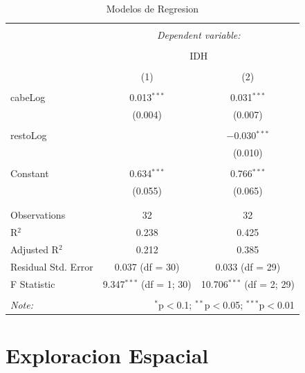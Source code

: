 \documentclass{article}
\begin{document}
\begin{table}[!htbp] \centering 
  \caption{Modelos de Regresion} 
  \label{regresiones} 
\begin{tabular}{@{\extracolsep{5pt}}lcc} 
\\[-1.8ex]\hline 
\hline \\[-1.8ex] 
 & \multicolumn{2}{c}{\textit{Dependent variable:}} \\ 
\cline{2-3} 
\\[-1.8ex] & \multicolumn{2}{c}{IDH} \\ 
\\[-1.8ex] & (1) & (2)\\ 
\hline \\[-1.8ex] 
 cabeLog & 0.013$^{***}$ & 0.031$^{***}$ \\ 
  & (0.004) & (0.007) \\ 
  & & \\ 
 restoLog &  & $-$0.030$^{***}$ \\ 
  &  & (0.010) \\ 
  & & \\ 
 Constant & 0.634$^{***}$ & 0.766$^{***}$ \\ 
  & (0.055) & (0.065) \\ 
  & & \\ 
\hline \\[-1.8ex] 
Observations & 32 & 32 \\ 
R$^{2}$ & 0.238 & 0.425 \\ 
Adjusted R$^{2}$ & 0.212 & 0.385 \\ 
Residual Std. Error & 0.037 (df = 30) & 0.033 (df = 29) \\ 
F Statistic & 9.347$^{***}$ (df = 1; 30) & 10.706$^{***}$ (df = 2; 29) \\ 
\hline 
\hline \\[-1.8ex] 
\textit{Note:}  & \multicolumn{2}{r}{$^{*}$p$<$0.1; $^{**}$p$<$0.05; $^{***}$p$<$0.01} \\ 
\end{tabular} 
\end{table} 
\clearpage


\section{Exploracion Espacial}
\end{document}
